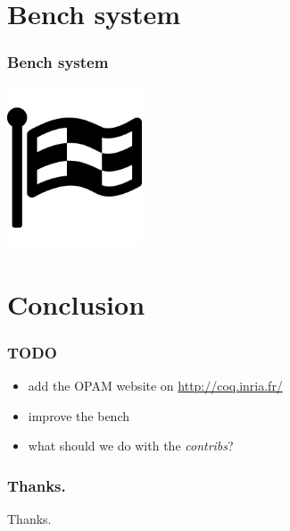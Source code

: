 \documentclass{beamer}
\begin{document}
  \section{Bench system}
  \begin{frame}
    \frametitle{Bench system}
    \begin{center}
      \includegraphics[width=4cm]{images/bench}
    \end{center}
  \end{frame}

  \section*{Conclusion}
  \begin{frame}
    \frametitle{TODO}
    \begin{itemize}
      \item add the OPAM website on \url{http://coq.inria.fr/}
      \item improve the bench
      \item what should we do with the \emph{contribs}?
    \end{itemize}
  \end{frame}
  \begin{frame}
    \frametitle{Thanks.}
    \Huge{Thanks.}
  \end{frame}
\end{document}
